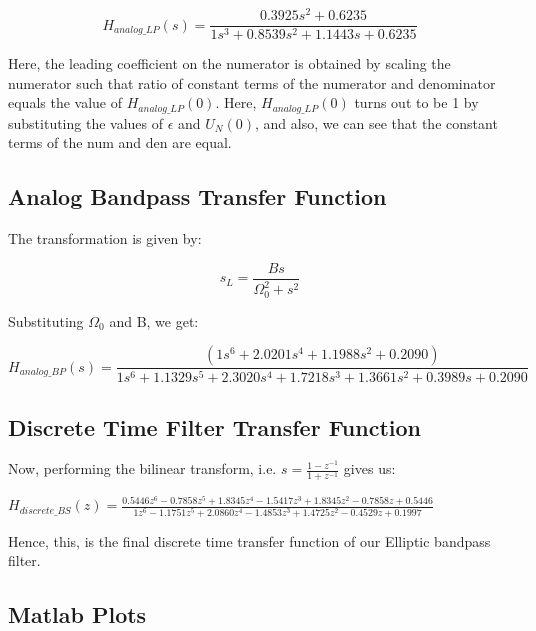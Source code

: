 \documentclass{article}
\begin{document}
\begin{equation}
    H_{analog\_LP}(s) = \frac{0.3925s^2 + 0.6235}{1s^3 + 0.8539s^2 + 1.1443s + 0.6235}
\end{equation}

Here, the leading coefficient on the numerator is obtained by scaling the numerator such that ratio of constant terms of the numerator and denominator equals the value of $H_{analog\_LP}(0)$. Here, $H_{analog\_LP}(0)$ turns out to be 1 by substituting the values of $\epsilon$ and $U_N(0)$, and also, we can see that the constant terms of the num and den are equal.

\subsection{Analog Bandpass Transfer Function}

The transformation is given by:
\vspace{-5mm}
\begin{center}
    \begin{equation*}
        s_L = \frac{Bs}{\Omega_0^2+s^2}
    \end{equation*}
\end{center}

Substituting $\Omega_0$ and B, we get:

\begin{equation*}
    H_{analog\_BP}(s) =\frac{(1s^6 + 2.0201s^4 + 1.1988s^2 + 0.2090)}{1s^6 + 1.1329s^5 + 2.3020s^4 + 1.7218s^3 + 1.3661s^2 + 0.3989s + 0.2090}
\end{equation*}

\subsection{Discrete Time Filter Transfer Function}

Now, performing the bilinear transform, i.e. $s = \frac{1-z^{-1}}{1+z^{-1}}$ gives us:

\begin{center}
$H_{discrete\_BS}(z) = \frac{0.5446z^6 - 0.7858z^5 + 1.8345z^4 - 1.5417z^3 + 1.8345z^2 - 0.7858z + 0.5446}{1z^6 - 1.1751z^5 + 2.0860z^4 - 1.4853z^3 + 1.4725z^2 - 0.4529z + 0.1997}$    
\end{center}

Hence, this, is the final discrete time transfer function of our Elliptic bandpass filter.
\clearpage

\subsection{Matlab Plots}
\end{document}
